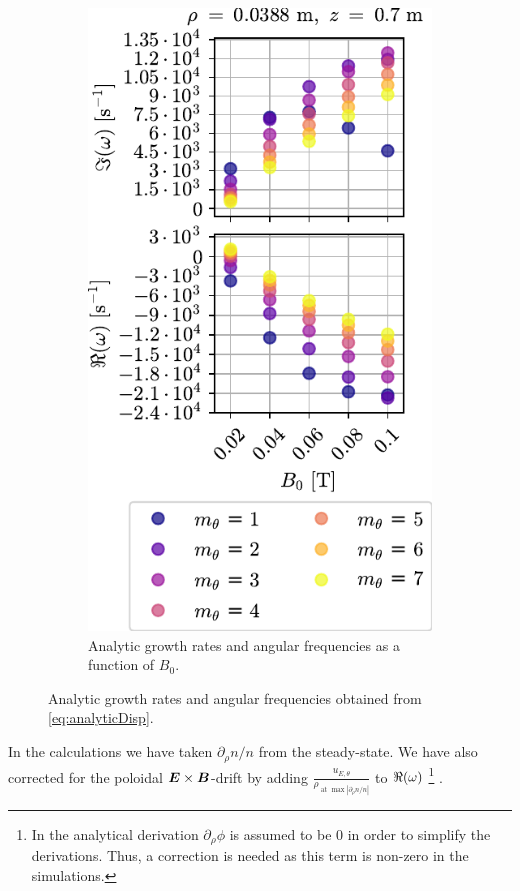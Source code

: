 \begin{figure}[htbp]
\begin{subfigure}[h]{0.45\textwidth}
        \centering
        \includegraphics{fig/results/growthRates/growthRatesAnalyticB0}
        \caption{Analytic growth rates and angular frequencies as a function of $B_0$.}
        \label{fig:grAnalyticBModeNr}
    \end{subfigure}%
    \caption{Analytic growth rates and angular frequencies obtained from \cref{eq:analyticDisp}.}
    \label{fig:analGR}
\end{figure}
%
In the calculations we have taken $\partial_\rho n/n$ from the steady-state.
We have also corrected for the poloidal $\boldsymbol{E}\times\boldsymbol{B}$-drift by adding $\frac{u_{E,\theta}}{\rho_{\text{ at }\max|\partial_\rho n/n|}}$ to $\Re(\omega)$%
\footnote{
    In the analytical derivation $\partial_\rho \phi$ is assumed to be $0$ in order to simplify the derivations.
    Thus, a correction is needed as this term is non-zero in the simulations.
}%
%
.

